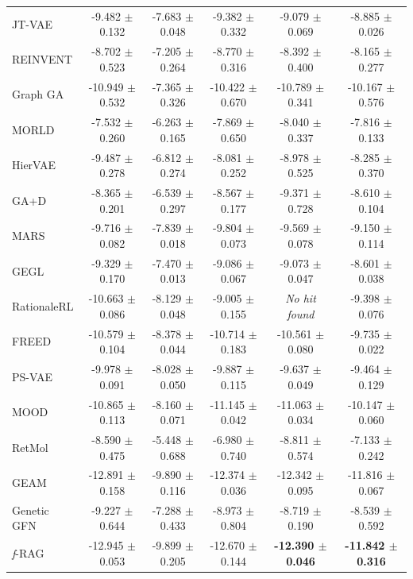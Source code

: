 \documentclass[lettersize,journal]{IEEEtran}
\begin{document}
\begin{table}[t]
\begin{tabular}{l ccccc}
        JT-VAE     & -9.482 $\pm$ 0.132 & -7.683 $\pm$ 0.048 & -9.382 $\pm$ 0.332 & -9.079 $\pm$ 0.069 & -8.885 $\pm$ 0.026 \\
        REINVENT   & -8.702 $\pm$ 0.523 & -7.205 $\pm$ 0.264 & -8.770 $\pm$ 0.316 & -8.392 $\pm$ 0.400 & -8.165 $\pm$ 0.277 \\
        Graph GA   & -10.949 $\pm$ 0.532 & -7.365 $\pm$ 0.326 & -10.422 $\pm$ 0.670 & -10.789 $\pm$ 0.341 & -10.167 $\pm$ 0.576 \\
        MORLD      & -7.532 $\pm$ 0.260 & -6.263 $\pm$ 0.165 & -7.869 $\pm$ 0.650 & -8.040 $\pm$ 0.337 & -7.816 $\pm$ 0.133 \\
        HierVAE    & -9.487 $\pm$ 0.278 & -6.812 $\pm$ 0.274 & -8.081 $\pm$ 0.252 & -8.978 $\pm$ 0.525 & -8.285 $\pm$ 0.370 \\
        GA+D       & -8.365 $\pm$ 0.201 & -6.539 $\pm$ 0.297 & -8.567 $\pm$ 0.177 & -9.371 $\pm$ 0.728 & -8.610 $\pm$ 0.104 \\
        MARS       & -9.716 $\pm$ 0.082 & -7.839 $\pm$ 0.018 & -9.804 $\pm$ 0.073 & -9.569 $\pm$ 0.078 & -9.150 $\pm$ 0.114 \\
        GEGL        & -9.329 $\pm$ 0.170 & -7.470 $\pm$ 0.013 & -9.086 $\pm$ 0.067 & -9.073 $\pm$ 0.047 & -8.601 $\pm$ 0.038 \\
        RationaleRL  & -10.663 $\pm$ 0.086 & -8.129 $\pm$ 0.048 & -9.005 $\pm$ 0.155 & \textit{No hit found} & -9.398 $\pm$ 0.076 \\
        FREED      & -10.579 $\pm$ 0.104 & -8.378 $\pm$ 0.044 & -10.714 $\pm$ 0.183 & -10.561 $\pm$ 0.080 & -9.735 $\pm$ 0.022 \\
        PS-VAE     & -9.978 $\pm$ 0.091 & -8.028 $\pm$ 0.050 & -9.887 $\pm$ 0.115 & -9.637 $\pm$ 0.049 & -9.464 $\pm$ 0.129 \\
        MOOD       & -10.865 $\pm$ 0.113 & -8.160 $\pm$ 0.071 & -11.145 $\pm$ 0.042 & -11.063 $\pm$ 0.034 & -10.147 $\pm$ 0.060 \\
        RetMol     & -8.590 $\pm$ 0.475 & -5.448 $\pm$ 0.688 & -6.980 $\pm$ 0.740 & -8.811 $\pm$ 0.574 & -7.133 $\pm$ 0.242 \\
        GEAM       & -12.891 $\pm$ 0.158 & -9.890 $\pm$ 0.116 & -12.374 $\pm$ 0.036 & -12.342 $\pm$ 0.095 & -11.816 $\pm$ 0.067 \\
        Genetic GFN  & -9.227 $\pm$ 0.644 & -7.288 $\pm$ 0.433 & -8.973 $\pm$ 0.804 & -8.719 $\pm$ 0.190 & -8.539 $\pm$ 0.592 \\
        \textit{f}-RAG  & -12.945 $\pm$ 0.053 & -9.899 $\pm$ 0.205 & -12.670 $\pm$ 0.144 & \textbf{-12.390 $\pm$ 0.046} & \textbf{-11.842 $\pm$ 0.316} \\
        \hline
        

\end{tabular}
\end{table}
\end{document}
